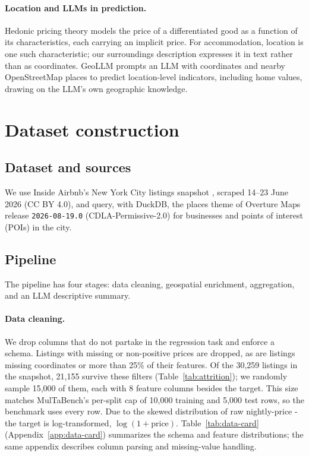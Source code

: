 \documentclass{article}
\begin{document}
\paragraph{Location and LLMs in prediction.} Hedonic pricing theory \citep{rosen1974hedonic} models the price of a
differentiated good as a function of its characteristics, each carrying an implicit price.
For accommodation, location is one such characteristic; our surroundings description expresses it in text
rather than as coordinates.
GeoLLM \citep{manvi2024geollm} prompts an LLM with coordinates and nearby OpenStreetMap places
to predict location-level indicators, including home values, drawing on the LLM's own geographic knowledge.


\section{Dataset construction}

\subsection{Dataset and sources}

We use Inside Airbnb's New York City listings snapshot \citep{insideairbnbnyc}, scraped 14--23 June 2026 (CC BY 4.0),
and query, with DuckDB, the places theme of Overture Maps release \texttt{2026-08-19.0} \citep{overtureplaces} (CDLA-Permissive-2.0)
for businesses and points of interest (POIs) in the city.

\subsection{Pipeline}

The pipeline has four stages: data cleaning, geospatial enrichment, aggregation, and an LLM descriptive summary.

\paragraph{Data cleaning.} We drop columns that do not partake in the regression task and enforce a schema.
Listings with missing or non-positive prices are dropped,
as are listings missing coordinates or more than 25\% of their features.
Of the 30,259 listings in the snapshot, 21,155 survive these filters (Table~\ref{tab:attrition}); we randomly sample 15,000 of them,
each with 8 feature columns besides the target.
This size matches MulTaBench's per-split cap of 10,000 training and 5,000 test rows, so the benchmark uses every row.
Due to the skewed distribution of raw nightly-price - the target is log-transformed, $\log(1 + \text{price})$.
Table~\ref{tab:data-card} (Appendix~\ref{app:data-card}) summarizes the schema and feature distributions;
the same appendix describes column parsing and missing-value handling.
\end{document}
